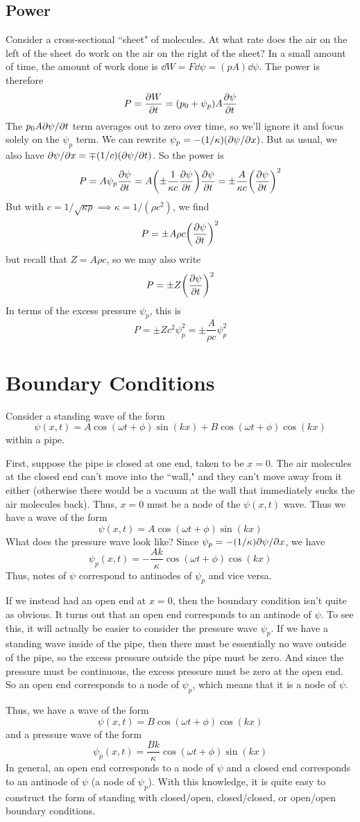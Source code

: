 \subsection*{Power}
Consider a cross-sectional ``sheet" of molecules. At what rate does the air on the left of the sheet do work on the air on the right of the sheet? In a small amount of time, the amount of work done is $\dd W = F\dd \psi = (pA)\dd \psi$. The power is therefore
\[ P = \pdv{W}{t} = (p_0 + \psi_p)A\pdv{\psi}{t} \]
The $p_0 A\partial \psi/\partial t$ term averages out to zero over time, so we'll ignore it and focus solely on the $\psi_p$ term. We can rewrite $\psi_p = -(1/\kappa)(\partial \psi/\partial x)$. But as usual, we also have $\partial \psi/\partial x = \mp (1/c)(\partial \psi/\partial t)$. So the power is
\[ P = A\psi_p \pdv{\psi}{t} = A \pqty{\pm \frac{1}{\kappa c}\pdv{\psi}{t}}\pdv{\psi}{t} = \pm \frac{A}{\kappa c}\pqty{\pdv{\psi}{t}}^2 \]
But with $c = 1/\sqrt{\kappa \rho} \implies \kappa = 1/(\rho c^2)$, we find
\[ P = \pm A\rho c \pqty{\pdv{\psi}{t}}^2\]
but recall that $Z = A\rho c$, so we may also write
\[ P = \pm Z \pqty{\pdv{\psi}{t}}^2\]
In terms of the excess pressure $\psi_p$, this is
\[ P = \pm Zc^2 \psi_p^2 = \pm \frac{A}{\rho c}\psi_p^2\]
\section{Boundary Conditions}
Consider a standing wave of the form
\[ \psi(x,t) = A\cos(\omega t+\phi)\sin(kx) + B\cos(\omega t+\phi)\cos(kx) \]
within a pipe.

First, suppose the pipe is closed at one end, taken to be $x=0$. The air molecules at the closed end can't move into the ``wall," and they can't move away from it either (otherwise there would be a vacuum at the wall that immediately sucks the air molecules back). Thus, $x=0$ must be a node of the $\psi(x,t)$ wave. Thus we have a wave of the form
\[ \psi(x,t) = A\cos(\omega t+\phi)\sin(kx) \]
What does the pressure wave look like? Since $\psi_p = -(1/\kappa)\partial \psi/\partial x$, we have
\[ \psi_p(x,t) = -\frac{Ak}{\kappa}\cos(\omega t+\phi)\cos(kx) \]
Thus, notes of $\psi$ correspond to antinodes of $\psi_p$ and vice versa. 

If we instead had an open end at $x=0$, then the boundary condition isn't quite as obvious. It turns out that an open end corresponds to an antinode of $\psi$. To see this, it will actually be easier to consider the pressure wave $\psi_p$. If we have a standing wave inside of the pipe, then there must be essentially no wave outside of the pipe, so the excess pressure outside the pipe must be zero. And since the pressure must be continuous, the excess pressure must be zero at the open end. So an open end corresponds to a node of $\psi_p$, which means that it is a node of $\psi$.

Thus, we have a wave of the form
\[ \psi(x,t) = B\cos(\omega t+\phi)\cos(kx)\]
and a pressure wave of the form
\[ \psi_p(x,t) = \frac{Bk}{\kappa}\cos(\omega t+\phi)\sin(kx)\]
In general, an open end corresponds to a node of $\psi$ and a closed end corresponds to an antinode of $\psi$ (a node of $\psi_p$). With this knowledge, it is quite easy to construct the form of standing with closed/open, closed/closed, or open/open boundary conditions.